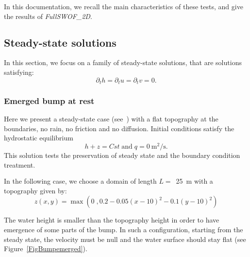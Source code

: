 \documentclass[a4paper, 11pt]{article}
\newcommand{\FullSWOF}{\emph{FullSWOF\_2D}}
\begin{document}
In this documentation, we recall the main characteristics of these tests, and give the results of \FullSWOF.


\subsection{Steady-state solutions}

In this section, we focus on a family of steady-state solutions, that are solutions satisfying:
\begin{equation*}
 \partial_t h=\partial_t u=\partial_t v=0.
\end{equation*}

\subsubsection{Emerged bump at rest}

Here we present a steady-state case (see~\citep[§~3.1.2]{Delestre13}) with a flat topography at the boundaries, no rain, no friction and no diffusion.
Initial conditions satisfy the hydrostatic equilibrium
\begin{equation}
  h+z=Cst\;\text{and}\;q=0~\text{m}^2/\text{s}.\label{hydeq}
\end{equation}
This solution tests the preservation of steady state and the boundary condition treatment.

\medskip

In the following case, we choose a domain of length $L = $~25~m with a topography given by:
\begin{equation*}
z(x,y) = \max\left(0\; , 0.2-0.05(x-10)^2-0.1(y-10)^2\right)
\end{equation*}

The water height is smaller than the topography height
in order to have emergence of some parts of the bump.   
In such a configuration, starting from the steady state, the velocity must be null and the water surface should stay flat (see Figure~\ref{FigBumpemerged}).
\end{document}
